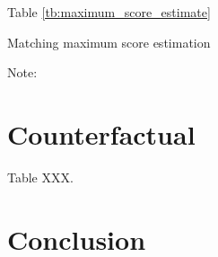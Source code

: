 \documentclass[10pt]{article}
\begin{document}
Table \ref{tb:maximum_score_estimate}

\begin{table}[!htbp]
  \begin{center}
      \caption{Matching maximum score estimation}
      \label{tb:maximum_score_estimate} 
      
  \end{center}\footnotesize
  Note: 
\end{table} 

\section{Counterfactual}

Table XXX.


\section{Conclusion}



\end{document}
